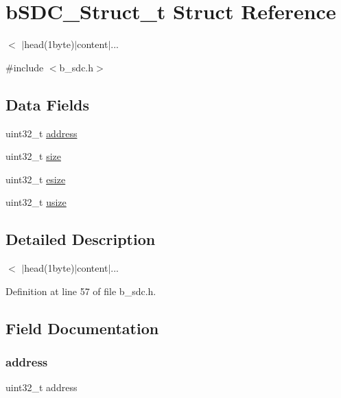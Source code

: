 \hypertarget{structb_s_d_c___struct__t}{}\section{b\+S\+D\+C\+\_\+\+Struct\+\_\+t Struct Reference}
\label{structb_s_d_c___struct__t}


$<$ $\vert$head(1byte)$\vert$content$\vert$...  




{\ttfamily \#include $<$b\+\_\+sdc.\+h$>$}

\subsection*{Data Fields}
\begin{DoxyCompactItemize}
\item 
uint32\+\_\+t \mbox{\hyperlink{structb_s_d_c___struct__t_ac0d31ca829f934cccd89f8054e02773e}{address}}
\item 
uint32\+\_\+t \mbox{\hyperlink{structb_s_d_c___struct__t_ab2c6b258f02add8fdf4cfc7c371dd772}{size}}
\item 
uint32\+\_\+t \mbox{\hyperlink{structb_s_d_c___struct__t_a7724841d84bdcadcc73fac6cc993563c}{esize}}
\item 
uint32\+\_\+t \mbox{\hyperlink{structb_s_d_c___struct__t_a546dee965d95ce52190c06bfb12a5d85}{usize}}
\end{DoxyCompactItemize}


\subsection{Detailed Description}
$<$ $\vert$head(1byte)$\vert$content$\vert$... 

Definition at line 57 of file b\+\_\+sdc.\+h.



\subsection{Field Documentation}
\mbox{\label{structb_s_d_c___struct__t_ac0d31ca829f934cccd89f8054e02773e}} 
\subsubsection{\texorpdfstring{address}{address}}
{\footnotesize\ttfamily uint32\+\_\+t address}



